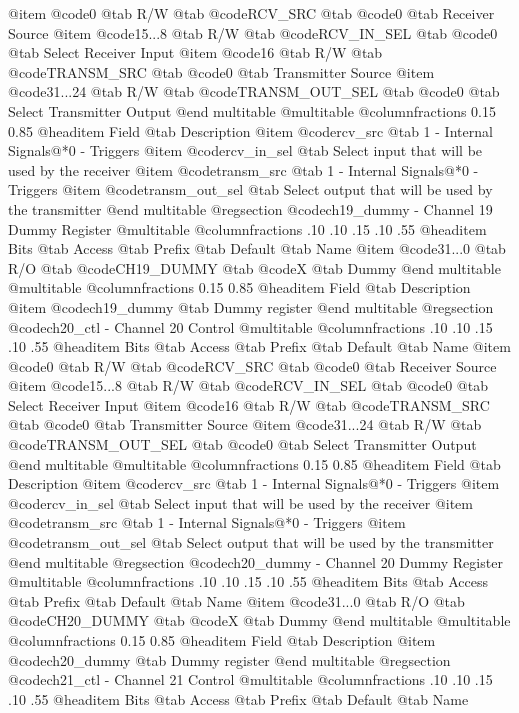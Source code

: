 @item @code{0}
@tab R/W @tab
@code{RCV_SRC}
@tab @code{0} @tab 
Receiver Source
@item @code{15...8}
@tab R/W @tab
@code{RCV_IN_SEL}
@tab @code{0} @tab 
Select Receiver Input
@item @code{16}
@tab R/W @tab
@code{TRANSM_SRC}
@tab @code{0} @tab 
Transmitter Source
@item @code{31...24}
@tab R/W @tab
@code{TRANSM_OUT_SEL}
@tab @code{0} @tab 
Select Transmitter Output
@end multitable
@multitable @columnfractions 0.15 0.85
@headitem Field @tab Description
@item @code{rcv_src} @tab 1 - Internal Signals@*0 - Triggers
@item @code{rcv_in_sel} @tab Select input that will be used by the receiver
@item @code{transm_src} @tab 1 - Internal Signals@*0 - Triggers
@item @code{transm_out_sel} @tab Select output that will be used by the transmitter
@end multitable
@regsection @code{ch19_dummy} - Channel 19 Dummy Register
@multitable @columnfractions .10 .10 .15 .10 .55
@headitem Bits @tab Access @tab Prefix @tab Default @tab Name
@item @code{31...0}
@tab R/O @tab
@code{CH19_DUMMY}
@tab @code{X} @tab 
Dummy
@end multitable
@multitable @columnfractions 0.15 0.85
@headitem Field @tab Description
@item @code{ch19_dummy} @tab Dummy register
@end multitable
@regsection @code{ch20_ctl} - Channel 20 Control
@multitable @columnfractions .10 .10 .15 .10 .55
@headitem Bits @tab Access @tab Prefix @tab Default @tab Name
@item @code{0}
@tab R/W @tab
@code{RCV_SRC}
@tab @code{0} @tab 
Receiver Source
@item @code{15...8}
@tab R/W @tab
@code{RCV_IN_SEL}
@tab @code{0} @tab 
Select Receiver Input
@item @code{16}
@tab R/W @tab
@code{TRANSM_SRC}
@tab @code{0} @tab 
Transmitter Source
@item @code{31...24}
@tab R/W @tab
@code{TRANSM_OUT_SEL}
@tab @code{0} @tab 
Select Transmitter Output
@end multitable
@multitable @columnfractions 0.15 0.85
@headitem Field @tab Description
@item @code{rcv_src} @tab 1 - Internal Signals@*0 - Triggers
@item @code{rcv_in_sel} @tab Select input that will be used by the receiver
@item @code{transm_src} @tab 1 - Internal Signals@*0 - Triggers
@item @code{transm_out_sel} @tab Select output that will be used by the transmitter
@end multitable
@regsection @code{ch20_dummy} - Channel 20 Dummy Register
@multitable @columnfractions .10 .10 .15 .10 .55
@headitem Bits @tab Access @tab Prefix @tab Default @tab Name
@item @code{31...0}
@tab R/O @tab
@code{CH20_DUMMY}
@tab @code{X} @tab 
Dummy
@end multitable
@multitable @columnfractions 0.15 0.85
@headitem Field @tab Description
@item @code{ch20_dummy} @tab Dummy register
@end multitable
@regsection @code{ch21_ctl} - Channel 21 Control
@multitable @columnfractions .10 .10 .15 .10 .55
@headitem Bits @tab Access @tab Prefix @tab Default @tab Name
